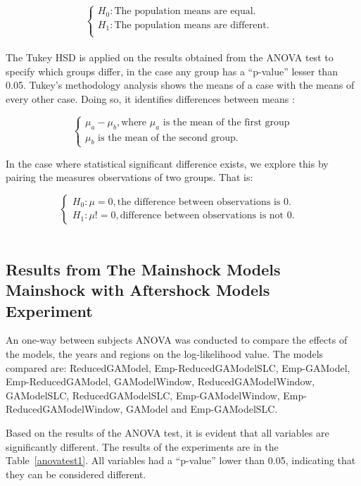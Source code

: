 $$\begin{cases} H_0: \text{The population means are equal.} &\\
H_1: \text{The population means are different.}&\\
\end{cases}$$\\

The Tukey HSD is applied on the results obtained from the ANOVA test
to specify which groups differ, in the case any group has a
``p-value'' lesser than 0.05. Tukey's methodology analysis shows the
means of a case with the means of every other case. Doing so, it
identifies differences between means :

$$\begin{cases}
\mu_a-\mu_b, \text{where $\mu_a$ is the mean of the first group}\\
                \text{$\mu_b$ is the mean of the second group.}
\end{cases}$$

In the case where statistical significant difference exists, we explore this by pairing the measures observations of two groups. That is:

$$\begin{cases}
H_0: \mu = 0, \text{the difference between observations is 0.}&\\
H_1: \mu != 0, \text{difference between observations is not 0.}
\end{cases}$$\\


\subsection{Results from The Mainshock Models Mainshock with Aftershock Models Experiment}\label{resultsBigExp}

An one-way between subjects ANOVA was conducted to compare the effects
of the models, the years and regions on the log-likelihood value. The
models compared are: ReducedGAModel, Emp-ReducedGAModelSLC,
Emp-GAModel, Emp-ReducedGAModel, GAModelWindow, ReducedGAModelWindow,
GAModelSLC, ReducedGAModelSLC, Emp-GAModelWindow,
Emp-ReducedGAModelWindow, GAModel and Emp-GAModelSLC.

Based on the results of the ANOVA test, it is evident that all
variables are significantly different. The results of the experiments
are in the Table~\ref{anovatest1}. All variables had a ``p-value''
lower than 0.05, indicating that they can be considered different.

